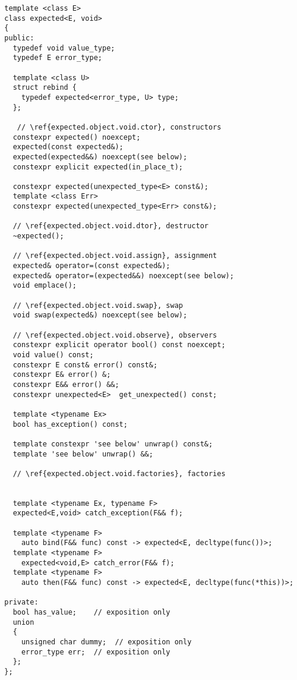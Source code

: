 \documentclass[a4paper,10pt]{article}
\begin{document}
\begin{lstlisting}
  template <class E>
  class expected<E, void>
  {
  public:
    typedef void value_type;
    typedef E error_type;
    
    template <class U>
    struct rebind {
      typedef expected<error_type, U> type;
    };
    
     // \ref{expected.object.void.ctor}, constructors
    constexpr expected() noexcept;
    expected(const expected&);
    expected(expected&&) noexcept(see below);
    constexpr explicit expected(in_place_t);     
      
    constexpr expected(unexpected_type<E> const&);
    template <class Err> 
    constexpr expected(unexpected_type<Err> const&);

    // \ref{expected.object.void.dtor}, destructor
    ~expected();

    // \ref{expected.object.void.assign}, assignment
    expected& operator=(const expected&);
    expected& operator=(expected&&) noexcept(see below);
    void emplace();

    // \ref{expected.object.void.swap}, swap
    void swap(expected&) noexcept(see below);

    // \ref{expected.object.void.observe}, observers
    constexpr explicit operator bool() const noexcept;
    void value() const;
    constexpr E const& error() const&;
    constexpr E& error() &;
    constexpr E&& error() &&;
    constexpr unexpected<E>  get_unexpected() const;
    
    template <typename Ex>
    bool has_exception() const;
    
    template constexpr 'see below' unwrap() const&;
    template 'see below' unwrap() &&;

    // \ref{expected.object.void.factories}, factories


    template <typename Ex, typename F>
    expected<E,void> catch_exception(F&& f);

    template <typename F>
      auto bind(F&& func) const -> expected<E, decltype(func())>;
    template <typename F>
      expected<void,E> catch_error(F&& f);
    template <typename F>
      auto then(F&& func) const -> expected<E, decltype(func(*this))>;

  private:
    bool has_value;    // exposition only
    union
    {
      unsigned char dummy;  // exposition only
      error_type err;  // exposition only
    };
  };

\end{lstlisting}
\end{document}
